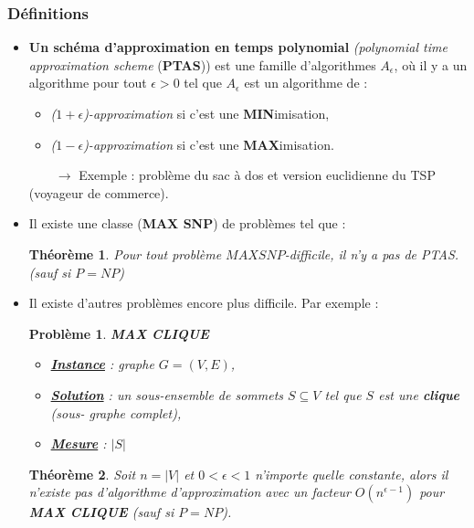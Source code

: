 \documentclass{article}
\newtheorem{thm}{Th\'eor\`eme}[section]
\newtheorem{pbm}{Problème}[section]
\begin{document}
\begin{sffamily}
\subsubsection{Définitions}

\begin{itemize}
\item \textbf{Un schéma d'approximation en temps polynomial} \textit{(polynomial time approximation scheme} (\textbf{PTAS})) est une
famille d'algorithmes $A_\epsilon$, où il y a un algorithme pour tout $\epsilon > 0$ tel que $A_\epsilon$ est un algorithme de :
\begin{itemize}
\item[*] \textit{($1+\epsilon$)-approximation} si c'est une \textbf{MIN}imisation,
\item[*] \textit{($1-\epsilon$)-approximation} si c'est une \textbf{MAX}imisation.
\end{itemize}
$\qquad \rightarrow$ Exemple : problème du sac à dos et version euclidienne du TSP (voyageur de commerce).

\item Il existe une classe (\textbf{MAX SNP}) de problèmes tel que :
\begin{thm} Pour tout problème \textit{$MAX SNP$-difficile}, il n'y a pas de PTAS. (sauf si $P = NP$)
\end{thm}

\item Il existe d'autres problèmes encore plus difficile. Par exemple :\\
\indent \hbox{}
\begin{pbm} \textbf{MAX CLIQUE}
\begin{itemize}
\item[*]\textbf{\underline{Instance}} : graphe $G=(V,E)$,
\item[*]\textbf{\underline{Solution}} : un sous-ensemble de sommets $S \subseteq V$ tel que $S$ est une \textbf{clique} \textit{(sous-
graphe complet)},
\item[*]\textbf{\underline{Mesure}} : $|S|$
\end{itemize}
\indent \hbox{}
\end{pbm}

\begin{thm}Soit $n = |V|$ et $0 < \epsilon < 1$ n'importe quelle constante, alors il n'existe pas d'algorithme d'approximation avec un
facteur $O(n^{\epsilon-1})$ pour \textbf{MAX CLIQUE} \textit{(sauf si $P = NP$)}.\end{thm}


\end{itemize}
\end{sffamily}
\end{document}
